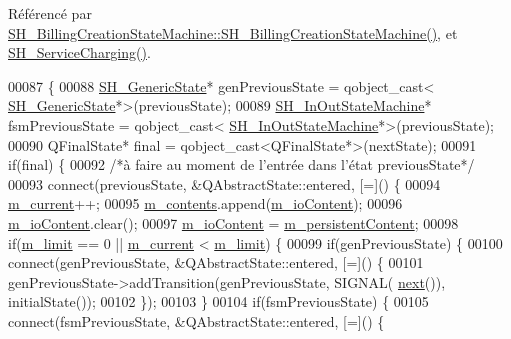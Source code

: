 Référencé par \hyperlink{classSH__BillingCreationStateMachine_ad62b77fa4aeafe200056ff3974562f83}{S\-H\-\_\-\-Billing\-Creation\-State\-Machine\-::\-S\-H\-\_\-\-Billing\-Creation\-State\-Machine()}, et \hyperlink{classSH__ServiceCharging_afa5273d046049b1c2b020a6a19a8290b}{S\-H\-\_\-\-Service\-Charging()}.


\begin{DoxyCode}
00087 \{
00088     \hyperlink{classSH__GenericState}{SH\_GenericState}* genPreviousState = qobject\_cast<
      \hyperlink{classSH__GenericState}{SH\_GenericState}*>(previousState);
00089     \hyperlink{classSH__InOutStateMachine}{SH\_InOutStateMachine}* fsmPreviousState = qobject\_cast<
      \hyperlink{classSH__InOutStateMachine}{SH\_InOutStateMachine}*>(previousState);
00090     QFinalState* \textcolor{keyword}{final} = qobject\_cast<QFinalState*>(nextState);
00091     \textcolor{keywordflow}{if}(\textcolor{keyword}{final}) \{
00092         \textcolor{comment}{/*à faire au moment de l'entrée dans l'état previousState*/}
00093         connect(previousState, &QAbstractState::entered, [=]() \{
00094             \hyperlink{classSh__LoopingInOutStateMachine_a6bcf7bcfe684dbd4d11ed327948e161b}{m\_current}++;
00095             \hyperlink{classSh__LoopingInOutStateMachine_a267e7cbcb3d6a137e2a4e1f93fb57e68}{m\_contents}.append(\hyperlink{classSH__InOutStateMachine_a661a1c7bd3b1086b3b5cd60ca957ecbd}{m\_ioContent});
00096             \hyperlink{classSH__InOutStateMachine_a661a1c7bd3b1086b3b5cd60ca957ecbd}{m\_ioContent}.clear();
00097             \hyperlink{classSH__InOutStateMachine_a661a1c7bd3b1086b3b5cd60ca957ecbd}{m\_ioContent} = \hyperlink{classSh__LoopingInOutStateMachine_ad9c0db5b057a6ba340ffcaddce60d6da}{m\_persistentContent};
00098             \textcolor{keywordflow}{if}(\hyperlink{classSh__LoopingInOutStateMachine_a320ece6cf74c2667c70059b9421117fb}{m\_limit} == 0 || \hyperlink{classSh__LoopingInOutStateMachine_a6bcf7bcfe684dbd4d11ed327948e161b}{m\_current} < \hyperlink{classSh__LoopingInOutStateMachine_a320ece6cf74c2667c70059b9421117fb}{m\_limit}) \{
00099                 \textcolor{keywordflow}{if}(genPreviousState) \{
00100                     connect(genPreviousState, &QAbstractState::entered, [=]() \{
00101                         genPreviousState->addTransition(genPreviousState, SIGNAL(
      \hyperlink{classSH__InOutStateMachine_aa9ee51efe0e17dcf5366c8a97b523892}{next}()), initialState());
00102                     \});
00103                 \}
00104                 \textcolor{keywordflow}{if}(fsmPreviousState) \{
00105                     connect(fsmPreviousState, &QAbstractState::entered, [=]() \{

\end{DoxyCode}
